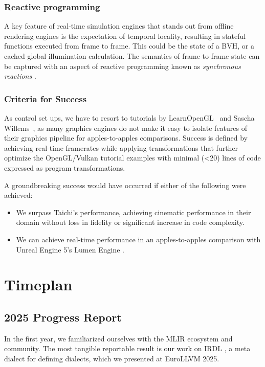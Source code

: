 \documentclass[review, acmsmall, nonacm]{acmart}
\begin{document}
\subsubsection{Reactive programming} A key feature of real-time simulation engines that stands out from offline rendering engines is the expectation of temporal locality, resulting in stateful functions executed from frame to frame. This could be the state of a BVH, or a cached global illumination calculation. The semantics of frame-to-frame state can be captured with an aspect of reactive programming known as \emph{synchronous reactions} \cite{pompougnacWeavingSynchronousReactions2022}.


\subsubsection{Criteria for Success} As control set ups, we have to resort to tutorials by LearnOpenGL~\cite{vriesJoeyDeVriesLearnOpenGL2025} and Sascha Willems~\cite{willemsSaschaWillemsVulkanExamples2025}, as many graphics engines do not make it easy to isolate features of their graphics pipeline for apples-to-apples comparisons. Success is defined by achieving real-time framerates while applying transformations that further optimize the OpenGL/Vulkan tutorial examples with minimal (<20) lines of code expressed as program transformations.

A groundbreaking success would have occurred if either of the following were achieved: 
\begin{itemize}
  \item We surpass Taichi's performance, achieving cinematic performance in their domain without loss in fidelity or significant increase in code complexity.
  \item We can achieve real-time performance in an apples-to-apples comparison with Unreal Engine 5's Lumen Engine \cite{epicgamesLumenGlobalIllumination2025}.
\end{itemize}

\section {Timeplan}

\subsection{2025 Progress Report}

In the first year, we familiarized ourselves with the MLIR ecosystem and community. The most tangible reportable result is our work \cite{hoMLIRIRDLAddedIRDL2025} on IRDL \cite{fehrIRDLIRDefinition2022}, a meta dialect for defining dialects, which we presented at EuroLLVM 2025.
\end{document}
